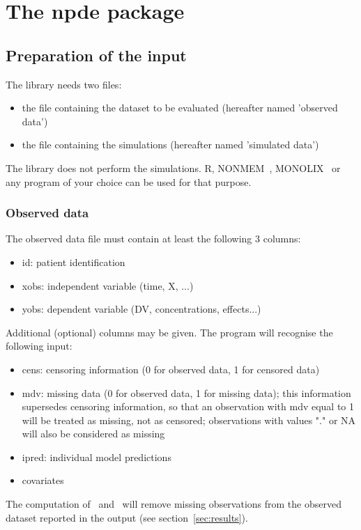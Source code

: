 \newpage
\section{The npde package} \label{sec:progdesc}

\subsection{Preparation of the input}

\hskip 18pt The library needs two files:
\begin{itemize}
\item the file containing the dataset to be evaluated (hereafter named 'observed data')
\item the file containing the simulations (hereafter named 'simulated data')
\end{itemize}
The library does not perform the simulations. {\sf R}, {\sf NONMEM}~\cite{NONMEM}, {\sf MONOLIX}~\cite{Monolix} or any program of your choice can be used for that purpose.

\subsubsection{Observed data}

\hskip 18pt The observed data file must contain at least the following 3 columns:
\begin{itemize}
\item id: patient identification
\item xobs: independent variable (time, X, ...)
\item yobs: dependent variable (DV, concentrations, effects...)
\end{itemize}
Additional (optional) columns may be given. The program will recognise the following input:
\begin{itemize}
\item cens: censoring information (0 for observed data, 1 for censored data)
\item mdv: missing data (0 for observed data, 1 for missing data); this information supersedes censoring information, so that an observation with mdv equal to 1 will be treated as missing, not as censored; observations with values "." or NA will also be considered as missing
\item ipred: individual model predictions
\item covariates
\end{itemize}
The computation of \pd~and \npde~will remove missing observations from the observed dataset reported in the output (see section~\ref{sec:results}).

